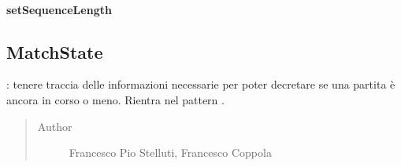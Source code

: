 \documentclass[letterpaper,10pt,italian,openany,oneside]{sphinxmanual}
\begin{document}
\begin{fulllineitems}
\label{\detokenize{test/it/unicam/cs/pa/mastermind/gamecore/MatchStartSettings:it.unicam.cs.pa.mastermind.gamecore.MatchStartSettings.setMakerFactory(MakerFactory)}}
\end{fulllineitems}



\paragraph{setSequenceLength}
\label{\detokenize{test/it/unicam/cs/pa/mastermind/gamecore/MatchStartSettings:setsequencelength}}

\begin{fulllineitems}
\label{\detokenize{test/it/unicam/cs/pa/mastermind/gamecore/MatchStartSettings:it.unicam.cs.pa.mastermind.gamecore.MatchStartSettings.setSequenceLength(int)}}
\end{fulllineitems}



\subsection{MatchState}
\label{\detokenize{test/it/unicam/cs/pa/mastermind/gamecore/MatchState:matchstate}}\label{\detokenize{test/it/unicam/cs/pa/mastermind/gamecore/MatchState::doc}}

\begin{fulllineitems}
\label{\detokenize{test/it/unicam/cs/pa/mastermind/gamecore/MatchState:it.unicam.cs.pa.mastermind.gamecore.MatchState}}
: tenere traccia delle informazioni necessarie per poter decretare se una partita è ancora in corso o meno. Rientra nel pattern .
\begin{quote}\begin{description}
\item[{Author}] \leavevmode
Francesco Pio Stelluti, Francesco Coppola

\end{description}\end{quote}

\end{fulllineitems}
\end{document}
